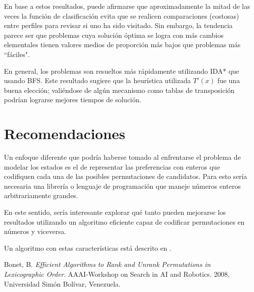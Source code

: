 \documentclass[letterpaper,12pt, titlepage]{article}
\begin{document}
\setcounter{section}{5}
\setcounter{page}{7}

En base a estos resultados, puede afirmarse que aproximadamente la mitad
de las veces la función de clasificación evita que se realicen comparaciones
(costosas) entre perfiles para revisar si uno ha sido visitado. Sin embargo,
la tendencia parece ser que problemas cuya solución óptima se logra con
más cambios elementales tienen valores medios de proporción más bajos que
problemas más ``fáciles".

En general, los problemas son resueltos más rápidamente utilizando IDA*
que usando BFS. Este resultado sugiere que la heurística utilizada $T'(x)$
fue una buena elección; valiéndose de algún mecanismo como tablas
de transposición podrían lograrse mejores tiempos de solución.

\section{Recomendaciones}
Un enfoque diferente que podría haberse tomado al enfrentarse el problema
de modelar los estados es el de representar las preferencias con
enteros que codifiquen cada una de las posibles permutaciones de candidatos.
Para esto sería necesaria una librería o lenguaje de programación
que maneje números enteros arbitrariamente grandes.

En este sentido, sería interesante explorar qué
tanto pueden mejorarse los resultados utilizando un algoritmo eficiente capaz de codificar permutaciones
en números y viceversa.

Un algoritmo con estas características está descrito en \cite{1}.

\begin{thebibliography}{9}

    Bonet, B.
    \emph{Efficient Algorithms to Rank and Unrank Permutations in Lexicographic Order}.
    AAAI-Workshop on Search in AI and Robotics.
    2008, Universidad Simón Bolívar, Venezuela.
\end{thebibliography}
\end{document}

